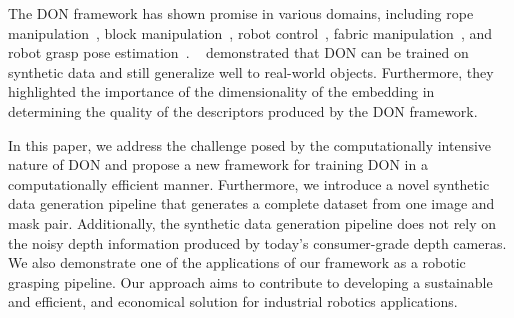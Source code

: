 The DON framework has shown promise in various domains, including rope manipulation~\cite{rope-manipulation},
block manipulation~\cite{block-manipulation}, robot control~\cite{florence2019self}, fabric manipulation~\cite{fabric-manipulation},
and robot grasp pose estimation~\parencites{kupcsik2021supervised}{adrian2022efficient}. \citeauthor{adrian2022efficient}~\cite{adrian2022efficient}
demonstrated that DON can be trained on
synthetic data and still generalize well to real-world objects. Furthermore, they highlighted the importance of the
dimensionality of the embedding in determining the quality of the descriptors produced by the DON framework.


In this paper, we address the challenge posed by the computationally intensive nature of DON and propose a new framework for training DON
in a computationally efficient manner. Furthermore, we introduce a novel synthetic data generation pipeline that generates a complete dataset
from one image and mask pair. Additionally, the synthetic data generation pipeline does not rely on the noisy depth information produced by
today's consumer-grade depth cameras. We also demonstrate one of the applications of our framework as a robotic grasping pipeline.
Our approach aims to contribute to developing a sustainable and efficient, and economical solution for industrial robotics applications.